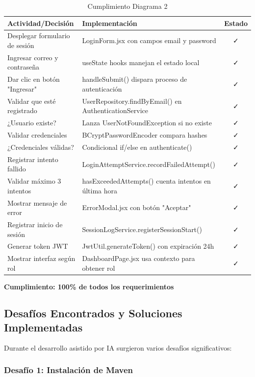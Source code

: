 \documentclass[11pt,a4paper]{article}
\begin{document}
\begin{table}[H]
\centering
\begin{tabularx}{\textwidth}{|l|X|c|}
\hline
\rowcolor{gray!20}
\textbf{Actividad/Decisión} & \textbf{Implementación} & \textbf{Estado} \\
\hline
Desplegar formulario de sesión & LoginForm.jsx con campos email y password & ✓ \\
\hline
Ingresar correo y contraseña & useState hooks manejan el estado local & ✓ \\
\hline
Dar clic en botón "Ingresar" & handleSubmit() dispara proceso de autenticación & ✓ \\
\hline
Validar que esté registrado & UserRepository.findByEmail() en AuthenticationService & ✓ \\
\hline
¿Usuario existe? & Lanza UserNotFoundException si no existe & ✓ \\
\hline
Validar credenciales & BCryptPasswordEncoder compara hashes & ✓ \\
\hline
¿Credenciales válidas? & Condicional if/else en authenticate() & ✓ \\
\hline
Registrar intento fallido & LoginAttemptService.recordFailedAttempt() & ✓ \\
\hline
Validar máximo 3 intentos & hasExceededAttempts() cuenta intentos en última hora & ✓ \\
\hline
Mostrar mensaje de error & ErrorModal.jsx con botón "Aceptar" & ✓ \\
\hline
Registrar inicio de sesión & SessionLogService.registerSessionStart() & ✓ \\
\hline
Generar token JWT & JwtUtil.generateToken() con expiración 24h & ✓ \\
\hline
Mostrar interfaz según rol & DashboardPage.jsx usa contexto para obtener rol & ✓ \\
\hline
\end{tabularx}
\caption{Cumplimiento Diagrama 2}
\end{table}

\textbf{Cumplimiento: 100\% de todos los requerimientos}

\subsection{Desafíos Encontrados y Soluciones Implementadas}

Durante el desarrollo asistido por IA surgieron varios desafíos significativos:

\subsubsection{Desafío 1: Instalación de Maven}
\end{document}
